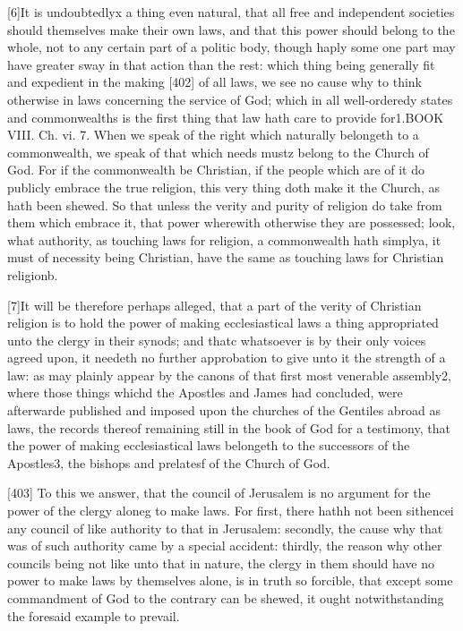 [6]It is undoubtedlyx a thing even natural, that all free and independent societies should themselves make their own laws, and that this power should belong to the whole, not to any certain part of a politic body, though haply some one part may have greater sway in that action than the rest: which thing being generally fit and expedient in the making [402] of all laws, we see no cause why to think otherwise in laws concerning the service of God; which in all well-orderedy states and commonwealths is the first thing that law hath care to provide for1.BOOK VIII. Ch. vi. 7. When we speak of the right which naturally belongeth to a commonwealth, we speak of that which needs mustz belong to the Church of God. For if the commonwealth be Christian, if the people which are of it do publicly embrace the true religion, this very thing doth make it the Church, as hath been shewed. So that unless the verity and purity of religion do take from them which embrace it, that power wherewith otherwise they are possessed; look, what authority, as touching laws for religion, a commonwealth hath simplya, it must of necessity being Christian, have the same as touching laws for Christian religionb.

[7]It will be therefore perhaps alleged, that a part of the verity of Christian religion is to hold the power of making ecclesiastical laws a thing appropriated unto the clergy in their synods; and thatc whatsoever is by their only voices agreed upon, it needeth no further approbation to give unto it the strength of a law: as may plainly appear by the canons of that first most venerable assembly2, where those things whichd the Apostles and James had concluded, were afterwarde published and imposed upon the churches of the Gentiles abroad as laws, the records thereof remaining still in the book of God for a testimony, that the power of making ecclesiastical laws belongeth to the successors of the Apostles3, the bishops and prelatesf of the Church of God.

[403]
To this we answer, that the council of Jerusalem is no argument for the power of the clergy aloneg to make laws. For first, there hathh not been sithencei any council of like authority to that in Jerusalem: secondly, the cause why that was of such authority came by a special accident: thirdly, the reason why other councils being not like unto that in nature, the clergy in them should have no power to make laws by themselves alone, is in truth so forcible, that except some commandment of God to the contrary can be shewed, it ought notwithstanding the foresaid example to prevail.

